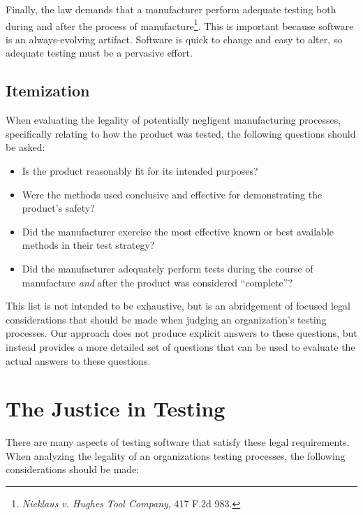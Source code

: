 Finally, the law demands that a manufacturer perform adequate testing both
during and after the process of manufacture\footnote{\textit{Nicklaus v. Hughes
Tool Company}, 417 F.2d 983.}. This is important because software is an
always-evolving artifact. Software is quick to change and easy to alter, so
adequate testing must be a pervasive effort.

\subsection{Itemization}
When evaluating the legality of potentially negligent manufacturing processes,
specifically relating to how the product was tested, the following questions
should be asked:

\singlespace
\begin{itemize}
  \item Is the product reasonably fit for its intended purposes?
  \item Were the methods used conclusive and effective for demonstrating the
  product's safety?
  \item Did the manufacturer exercise the most effective known or best available
  methods in their test strategy?
  \item Did the manufacturer adequately perform tests during the course of
  manufacture \textit{and} after the product was considered ``complete''?
\end{itemize}
\doublespace

This list is not intended to be exhaustive, but is an abridgement of focused
legal considerations that should be made when judging an organization's testing
processes. Our approach does not produce explicit answers to these questions,
but instead provides a more detailed set of questions that can be used to
evaluate the actual answers to these questions.

\section{The Justice in Testing}

There are many aspects of testing software that satisfy these legal
requirements. When analyzing the legality of an organizations testing processes,
the following considerations should be made:

